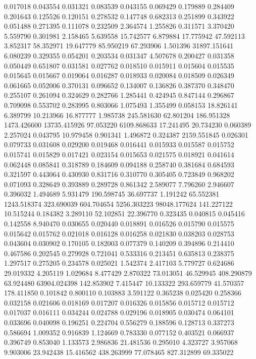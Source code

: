 0.017018
0.043554
0.031321
0.083539
0.043155
0.069429
0.179889
0.284409
0.201643
0.125526
0.120151
0.278532
0.147748
0.682313
0.251899
0.343922
0.051488
0.271395
0.111078
0.232509
2.364574
1.255826
0.311571
3.370420
5.559790
0.301981
2.158465
5.639558
15.742577
6.879884
17.775942
47.592113
3.852317
58.352971
19.647779
85.950219
67.293906
1.501396
31897.151641
6.080239
0.329355
0.054201
0.203534
0.031347
4.507678
0.200427
0.031358
0.050449
0.651807
0.031581
0.027762
0.018510
0.015911
0.015604
0.015535
0.015645
0.015667
0.019064
0.016287
0.018933
0.020084
0.018509
0.026349
0.061665
0.052006
0.370131
0.096652
0.134007
0.136826
0.387370
0.348470
0.255107
0.261094
0.324629
0.282766
1.285441
0.424945
0.847144
0.296867
0.709098
0.553702
0.283995
0.803066
1.075493
1.355499
0.058153
18.826141
6.389799
10.213966
16.877777
1.985738
245.581630
62.801204
186.951328
1473.426600
13735.415926
97.053220
6109.868633
17.241495
20.734230
0.060389
2.257024
0.043795
10.979458
0.901341
1.496872
0.324387
2159.551845
0.026301
0.079733
0.031608
0.029200
0.019468
0.016441
0.015933
0.015587
0.015752
0.015741
0.015829
0.017421
0.023154
0.015653
0.021575
0.018921
0.041614
0.062448
0.085841
0.318789
0.184609
0.094188
0.258740
0.381684
0.684593
0.321597
0.443064
0.430930
0.831716
0.310770
0.305405
0.723849
0.968202
0.071093
0.328649
0.393889
0.289728
0.861342
2.589077
7.796260
2.946607
0.396032
1.494689
5.931479
190.598745
36.697737
1.191242
65.552381
1243.518374
323.690039
604.704654
5256.303223
98048.177624
141.227122
10.515244
0.184382
3.289110
52.102851
22.396770
0.323435
0.040815
0.045416
0.142558
8.940470
0.030655
0.020440
0.018891
0.016526
0.015790
0.015575
0.015642
0.015762
0.021018
0.016128
0.016258
0.021830
0.038203
0.028753
0.043604
0.030902
0.170105
0.182003
0.077379
0.140209
0.394896
0.214410
0.467586
0.202545
0.279928
0.721041
0.533316
0.213451
0.635813
0.238375
1.297517
0.275205
0.234578
0.025021
1.542374
2.417103
5.779727
0.624686
29.019332
4.205119
1.029684
8.477429
2.870322
73.013051
46.529945
408.290879
63.924480
63904.024398
142.853902
7.415447
10.133322
293.659779
41.570357
178.411850
0.101842
0.800110
0.103883
3.591122
0.365238
0.025420
0.258366
0.032158
0.021606
0.018169
0.017207
0.016326
0.015856
0.015712
0.015712
0.017037
0.016111
0.034244
0.024788
0.029196
0.018905
0.030474
0.064101
0.033696
0.040098
0.196251
0.224704
0.556279
0.188596
0.128713
0.337273
0.586694
1.009352
0.916839
1.124669
0.783330
0.077152
0.403521
0.066937
0.396749
0.853040
1.133573
2.986836
21.481536
0.295010
4.323727
3.957068
9.903006
23.942438
15.416562
438.263999
77.078465
827.312899
69.335022
